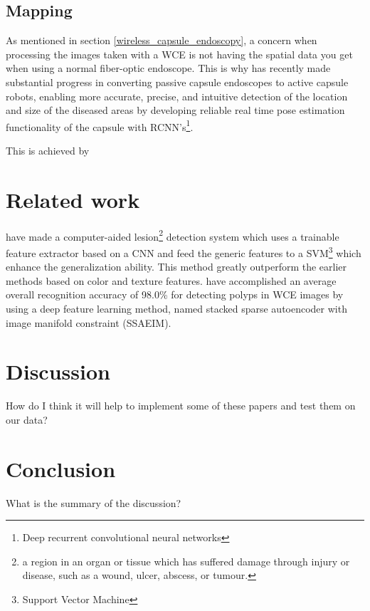 \documentclass[english, a4paper]{report}
\begin{document}
\subsection{Mapping} \label{mapping}
As mentioned in section \ref{wireless_capsule_endoscopy}, a concern when processing the images taken with a WCE is not having the spatial data you get when using a normal fiber-optic endoscope. This is why \citeauthor*{DeepEndoVO18} has recently made substantial progress in converting passive capsule endoscopes to active capsule robots, enabling more accurate, precise, and intuitive detection of the location and size of the diseased areas by developing reliable real time pose estimation functionality of the capsule with RCNN's\footnote{Deep recurrent convolutional neural networks}. \cite{DeepEndoVO18}

This is achieved by


\section{Related work} \label{related_work}
 \citeauthor*{LesionDetection15} \cite{LesionDetection15} have made a computer-aided lesion\footnote{a region in an organ or tissue which has suffered damage through injury or disease, such as a wound, ulcer, abscess, or tumour.} detection system which uses a trainable feature extractor based on a CNN and feed the generic features to a SVM\footnote{Support Vector Machine} which enhance the generalization ability. This method greatly outperform the earlier methods based on color and texture features. \citeauthor*{DeepLearning17} \cite{DeepLearning17} have accomplished an average overall recognition accuracy of 98.0\% for detecting polyps in WCE images by using a deep feature learning method, named stacked sparse autoencoder with image manifold constraint (SSAEIM).



\section{Discussion} \label{discussion}
How do I think it will help to implement some of these papers and test them on our data?



\section{Conclusion} \label{conclusion}
What is the summary of the discussion?


\newpage
\printbibliography
\end{document}
